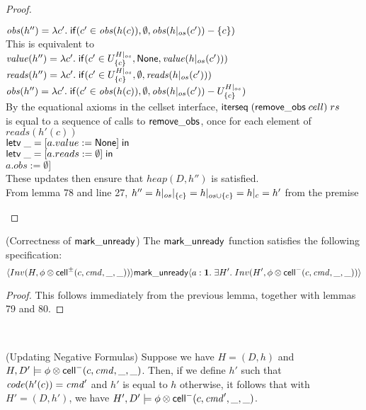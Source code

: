 \begin{proof}
\begin{tabbedproof}
\oooox $\mathit{obs}(h'') = \lambda c'.\;\mathsf{if}({c'\in \mathit{obs}(h(c))}, {\emptyset}, {\mathit{obs}(h|_{os}(c')) - \{{c}\}})$ \\
\oooo This is equivalent to \\
\oooox $\mathit{value}(h'') = \lambda c'.\;\mathsf{if}({c' \in U^{H|_{os}}_{\{{c}\}}}, {\mathsf{None}}, {\mathit{value}(h|_{os}(c'))})$ \\
\oooox $\mathit{reads}(h'') = \lambda c'.\;\mathsf{if}({c' \in U^{H|_{os}}_{\{{c}\}}}, {\emptyset}, {\mathit{reads}(h|_{os}(c'))})$ \\
\oooox $\mathit{obs}(h'') = \lambda c'.\;\mathsf{if}({c'\in \mathit{obs}(h(c))}, {\emptyset}, {\mathit{obs}(h|_{os}(c')) - U^{H|_{os}}_{\{{c}\}}})$ \\
\oooo By the equational axioms in the cellset interface, $\mathsf{iterseq}\;(\mathsf{remove\_obs}\;cell)\;rs$ \\
\ooox is equal to a sequence of calls to $\mathsf{remove\_obs}$, once for each element of $\mathit{reads}(h'(c))$\\
\oooo $\mathsf{letv}\;\_ = [a.value := \mathsf{None}]\;\mathsf{in}\;$ \\
\oooo $\mathsf{letv}\;\_ = [a.reads := \emptyset]\;\mathsf{in}\;$ \\
\oooo $a.obs := \emptyset]$ \\
\oooo These updates then ensure that $\mathit{heap}(D, h'')$ is satisfied. \\
\oooo From lemma 78 and line 27,  $h'' = h|_{os}|_{\{{c}\}} = h|_{os \cup \{{c}\}} = h|_{c} = h'$ from the premise\\ 
\end{tabbedproof}
\end{proof}

\begin{lemma}{(Correctness of $\mathsf{mark\_unready}$)}
The $\mathsf{mark\_unready}$ function satisfies the following specification:   
\begin{displaymath}
\langle{Inv(H, \phi \otimes \mathsf{cell}^{\pm}({c}, {\mathit{cmd}}, {\_}, {\_}))}\rangle{\mathsf{mark\_unready}}\langle{a:\mathbf{1}}.\;{\exists H'.\;Inv(H', \phi \otimes \mathsf{cell}^{-}({c}, {\mathit{cmd}}, {\_}, {\_}))}\rangle
\end{displaymath}
\end{lemma}

\begin{proof}
  This follows immediately from the previous lemma, together with lemmas 79 and 80. 
\end{proof}

\ \\

\begin{lemma}{(Updating Negative Formulas)}
Suppose we have  $H = (D,h)$ and $H, D' \models \phi \otimes \mathsf{cell}^{-}({c}, {\mathit{cmd}}, {\_}, {\_})$. Then, if
we define $h'$ such that $\mathit{code}(h'(c)) = \mathit{cmd}'$ and $h'$ is equal to $h$ otherwise, 
it follows that with $H' = (D,h')$, we have $H', D' \models \phi \otimes \mathsf{cell}^{-}({c}, {\mathit{cmd}'}, {\_}, {\_})$. 
\end{lemma}

